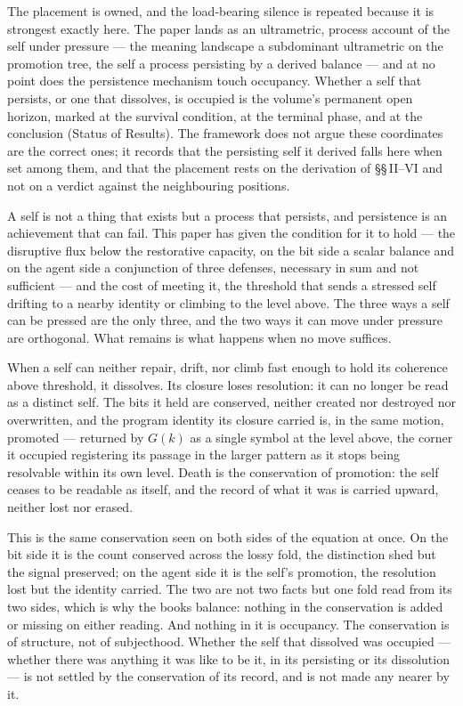 \documentclass[11pt,oneside]{report}
\theoremstyle{definition}
\theoremstyle{remark}
\begin{document}
The placement is owned, and the load-bearing silence is repeated because it is strongest exactly here. The paper lands as an ultrametric, process account of the self under pressure --- the meaning landscape a subdominant ultrametric on the promotion tree, the self a process persisting by a derived balance --- and at no point does the persistence mechanism touch occupancy. Whether a self that persists, or one that dissolves, is occupied is the volume's permanent open horizon, marked at the survival condition, at the terminal phase, and at the conclusion (Status of Results). The framework does not argue these coordinates are the correct ones; it records that the persisting self it derived falls here when set among them, and that the placement rests on the derivation of \S\S\,II--VI and not on a verdict against the neighbouring positions.



A self is not a thing that exists but a process that persists, and persistence is an achievement that can fail. This paper has given the condition for it to hold --- the disruptive flux below the restorative capacity, on the bit side a scalar balance and on the agent side a conjunction of three defenses, necessary in sum and not sufficient --- and the cost of meeting it, the threshold that sends a stressed self drifting to a nearby identity or climbing to the level above. The three ways a self can be pressed are the only three, and the two ways it can move under pressure are orthogonal. What remains is what happens when no move suffices.

When a self can neither repair, drift, nor climb fast enough to hold its coherence above threshold, it dissolves. Its closure loses resolution: it can no longer be read as a distinct self. The bits it held are conserved, neither created nor destroyed nor overwritten, and the program identity its closure carried is, in the same motion, promoted --- returned by \ensuremath{G(k)} as a single symbol at the level above, the corner it occupied registering its passage in the larger pattern as it stops being resolvable within its own level. Death is the conservation of promotion: the self ceases to be readable as itself, and the record of what it was is carried upward, neither lost nor erased.

This is the same conservation seen on both sides of the equation at once. On the bit side it is the count conserved across the lossy fold, the distinction shed but the signal preserved; on the agent side it is the self's promotion, the resolution lost but the identity carried. The two are not two facts but one fold read from its two sides, which is why the books balance: nothing in the conservation is added or missing on either reading. And nothing in it is occupancy. The conservation is of structure, not of subjecthood. Whether the self that dissolved was occupied --- whether there was anything it was like to be it, in its persisting or its dissolution --- is not settled by the conservation of its record, and is not made any nearer by it.
\end{document}
